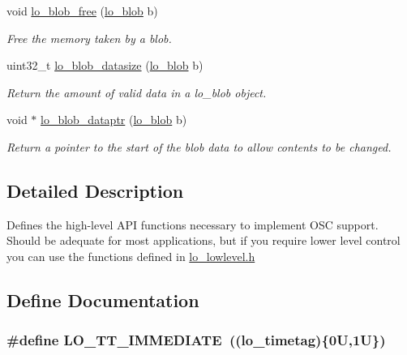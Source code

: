 \begin{DoxyCompactItemize}
void \hyperlink{group__liblo_gaa46ef058cfdf14a16936c062ebac19b9}{lo\-\_\-blob\-\_\-free} (\hyperlink{lo__types_8h_a8e780f8c09e3e4dd737fe249f11d16fc}{lo\-\_\-blob} b)
\begin{DoxyCompactList}\small\item\em \-Free the memory taken by a blob. \end{DoxyCompactList}\item 
uint32\-\_\-t \hyperlink{group__liblo_gab6c9184f0a54f19319d8a6409487b466}{lo\-\_\-blob\-\_\-datasize} (\hyperlink{lo__types_8h_a8e780f8c09e3e4dd737fe249f11d16fc}{lo\-\_\-blob} b)
\begin{DoxyCompactList}\small\item\em \-Return the amount of valid data in a lo\-\_\-blob object. \end{DoxyCompactList}\item 
void $\ast$ \hyperlink{group__liblo_ga064e3435301e0df338b75023a7ebf38e}{lo\-\_\-blob\-\_\-dataptr} (\hyperlink{lo__types_8h_a8e780f8c09e3e4dd737fe249f11d16fc}{lo\-\_\-blob} b)
\begin{DoxyCompactList}\small\item\em \-Return a pointer to the start of the blob data to allow contents to be changed. \end{DoxyCompactList}\end{DoxyCompactItemize}


\subsection{\-Detailed \-Description}
\-Defines the high-\/level \-A\-P\-I functions necessary to implement \-O\-S\-C support. \-Should be adequate for most applications, but if you require lower level control you can use the functions defined in \hyperlink{lo__lowlevel_8h}{lo\-\_\-lowlevel.\-h} 

\subsection{\-Define \-Documentation}
\hypertarget{group__liblo_gafa8cfc08b763b0c039fb64a73c4c77da}{
\subsubsection[{\-L\-O\-\_\-\-T\-T\-\_\-\-I\-M\-M\-E\-D\-I\-A\-T\-E}]{\setlength{\rightskip}{0pt plus 5cm}\#define {\bf \-L\-O\-\_\-\-T\-T\-\_\-\-I\-M\-M\-E\-D\-I\-A\-T\-E}~(({\bf lo\-\_\-timetag})\{0\-U,1\-U\})}}\label{group__liblo_gafa8cfc08b763b0c039fb64a73c4c77da}


